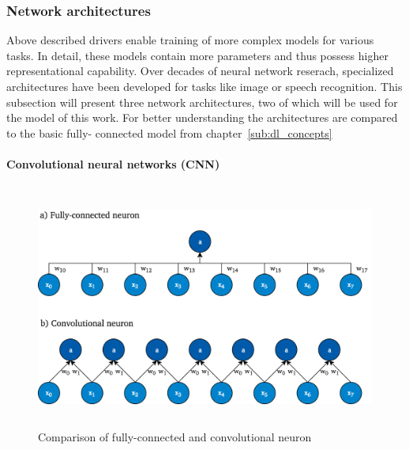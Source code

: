 \subsubsection{Network architectures}
\label{sub:dl_architectures}

Above described drivers enable training of more complex models for various
tasks.
In detail, these models contain more parameters and thus possess higher
representational capability.
Over decades of neural network reserach, specialized architectures have been
developed for tasks like image or speech recognition.
This subsection will present three network architectures, two of which will
be used for the model of this work.
For better understanding the architectures are compared to the basic fully-
connected model from chapter~\ref{sub:dl_concepts}

\paragraph{Convolutional neural networks (CNN)}

\begin{figure}[h]
  \centering
  \includegraphics[height=8cm]{img/conv_layer.png}
  \caption{Comparison of fully-connected and convolutional neuron}
\label{fig:conv_layer}
\end{figure}

